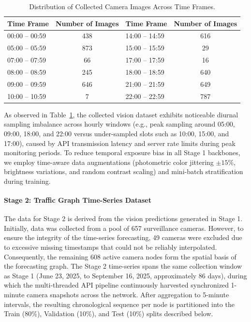 \documentclass[journal,twocolumn]{IEEEtran}
\begin{document}
\begin{table}[htbp]
    \centering
    \caption{Distribution of Collected Camera Images Across Time Frames.}
    \label{tab:time_distribution}
    \begin{tabular}{lc | lc}
        \toprule
        \textbf{Time Frame} & \textbf{Number of Images} & \textbf{Time Frame} & \textbf{Number of Images} \\
        \midrule
        00:00 -- 00:59 & 438 & 14:00 -- 14:59 & 616 \\
        05:00 -- 05:59 & 873 & 15:00 -- 15:59 & 29 \\
        07:00 -- 07:59 & 66  & 17:00 -- 17:59 & 16 \\
        08:00 -- 08:59 & 245 & 18:00 -- 18:59 & 640 \\
        09:00 -- 09:59 & 646 & 21:00 -- 21:59 & 649 \\
        10:00 -- 10:59 & 7   & 22:00 -- 22:59 & 787 \\
        \bottomrule
    \end{tabular}
\end{table}

As observed in Table~\ref{tab:time_distribution}, the collected vision dataset exhibits noticeable diurnal sampling imbalance across hourly windows (e.g., peak sampling around 05:00, 09:00, 18:00, and 22:00 versus under-sampled slots such as 10:00, 15:00, and 17:00), caused by API transmission latency and server rate limits during peak monitoring periods. To reduce temporal exposure bias in all Stage 1 backbones, we employ time-aware data augmentations (photometric color jittering $\pm 15\%$, brightness variations, and random contrast scaling) and mini-batch stratification during training.

\paragraph{Stage 2: Traffic Graph Time-Series Dataset}
The data for Stage 2 is derived from the vision predictions generated in Stage 1. Initially, data was collected from a pool of 657 surveillance cameras. However, to ensure the integrity of the time-series forecasting, 49 cameras were excluded due to excessive missing timestamps that could not be reliably interpolated. Consequently, the remaining 608 active camera nodes form the spatial basis of the forecasting graph. The Stage 2 time-series spans the same collection window as Stage 1 (June 23, 2025, to September 16, 2025, approximately 86 days), during which the multi-threaded API pipeline continuously harvested synchronized 1-minute camera snapshots across the network. After aggregation to 5-minute intervals, the resulting chronological sequence per node is partitioned into the Train (80\%), Validation (10\%), and Test (10\%) splits described below.
\end{document}
